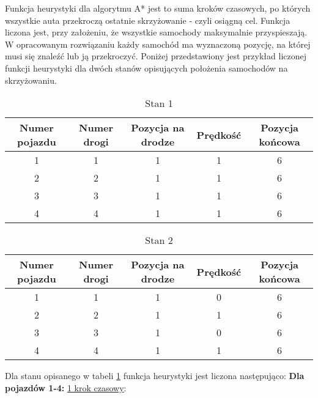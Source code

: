 Funkcja heurystyki dla algorytmu A* jest to suma kroków czasowych, po których wszystkie auta przekroczą ostatnie skrzyżowanie - czyli osiągną cel. Funkcja liczona jest, przy założeniu, że wszystkie samochody maksymalnie przyspieszają.
\newline
\newline
W opracowanym rozwiązaniu każdy samochód ma wyznaczoną pozycję, na której musi się znaleźć lub ją przekroczyć. Poniżej przedstawiony jest przykład liczonej funkcji heurystyki dla dwóch stanów opisujących położenia samochodów na skrzyżowaniu.
\newline
\newline
\begin{table}[t]
    \begin{tabular}{|c|c|c|c|c|}
      \hline 
      Numer pojazdu & Numer drogi & Pozycja na drodze & Prędkość & Pozycja końcowa\\
      \hline
      1 & 1 & 1 & 1 & 6 \\
      \hline
      2 & 2 & 1 & 1 & 6 \\
      \hline
      3 & 3 & 1 & 1 & 6 \\
      \hline
      4 & 4 & 1 & 1 & 6 \\
      \hline
    \end{tabular} 
    \caption{Stan 1}
    \label{FirstState}
\end{table}
\newline
\begin{table}[t]
    \begin{tabular}{|c|c|c|c|c|}
      \hline 
      Numer pojazdu & Numer drogi & Pozycja na drodze & Prędkość & Pozycja końcowa\\
      \hline
      1 & 1 & 1 & 0 & 6 \\
      \hline
      2 & 2 & 1 & 1 & 6 \\
      \hline
      3 & 3 & 1 & 0 & 6 \\
      \hline
      4 & 4 & 1 & 1 & 6 \\
      \hline
    \end{tabular} 
    \caption{Stan 2}
    \label{SecondState}
\end{table}
\newpage
Dla stanu opisanego w tabeli \ref{FirstState} funkcja heurystyki jest liczona następująco:
\newline
\newline
\textbf{Dla pojazdów 1-4:}
\newline
\newline
\underline{1 krok czasowy}:
\newline
